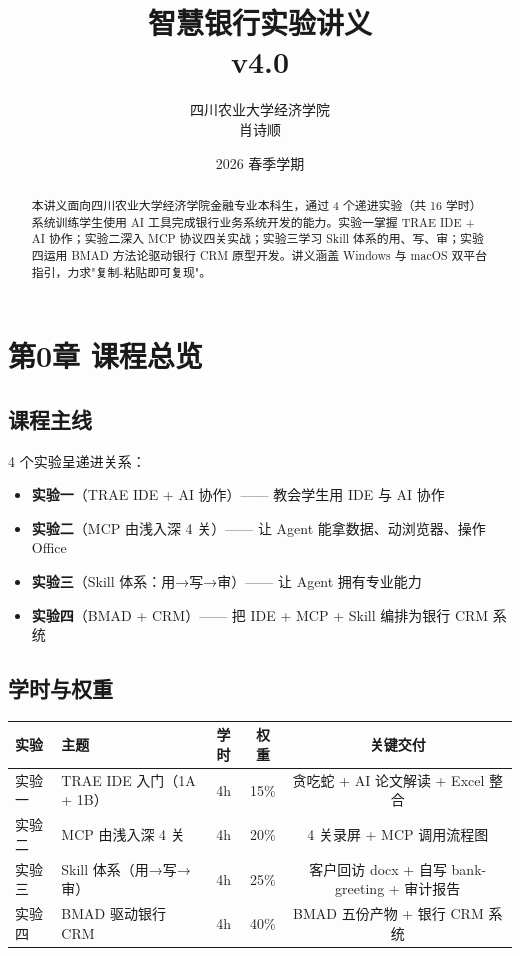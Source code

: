 \documentclass[12pt,a4paper]{ctexart}
\title{
  \vspace{-2cm}
  {\LARGE\bfseries 智慧银行实验讲义} \\[0.5em]
  {\large v4.0}
}
\author{
  四川农业大学经济学院 \\
  肖诗顺
}
\date{2026 春季学期}
\begin{document}
\maketitle

\begin{abstract}
本讲义面向四川农业大学经济学院金融专业本科生，通过 4 个递进实验（共 16 学时）系统训练学生使用 AI 工具完成银行业务系统开发的能力。实验一掌握 TRAE IDE + AI 协作；实验二深入 MCP 协议四关实战；实验三学习 Skill 体系的用、写、审；实验四运用 BMAD 方法论驱动银行 CRM 原型开发。讲义涵盖 Windows 与 macOS 双平台指引，力求"复制-粘贴即可复现"。
\end{abstract}

\tableofcontents
\clearpage

\section{第0章 课程总览}

\subsection{课程主线}

4 个实验呈递进关系：

\begin{itemize}[leftmargin=2em]
  \item \textbf{实验一}（TRAE IDE + AI 协作）—— 教会学生用 IDE 与 AI 协作
  \item \textbf{实验二}（MCP 由浅入深 4 关）—— 让 Agent 能拿数据、动浏览器、操作 Office
  \item \textbf{实验三}（Skill 体系：用→写→审）—— 让 Agent 拥有专业能力
  \item \textbf{实验四}（BMAD + CRM）—— 把 IDE + MCP + Skill 编排为银行 CRM 系统
\end{itemize}

\subsection{学时与权重}

\begin{table}[H]
\centering
\begin{tabular}{llccc}
\toprule
\textbf{实验} & \textbf{主题} & \textbf{学时} & \textbf{权重} & \textbf{关键交付} \\
\midrule
实验一 & TRAE IDE 入门（1A + 1B） & 4h & 15\% & 贪吃蛇 + AI 论文解读 + Excel 整合 \\
实验二 & MCP 由浅入深 4 关 & 4h & 20\% & 4 关录屏 + MCP 调用流程图 \\
实验三 & Skill 体系（用→写→审） & 4h & 25\% & 客户回访 docx + 自写 bank-greeting + 审计报告 \\
实验四 & BMAD 驱动银行 CRM & 4h & 40\% & BMAD 五份产物 + 银行 CRM 系统 \\
\bottomrule
\end{tabular}
\end{table}
\end{document}
